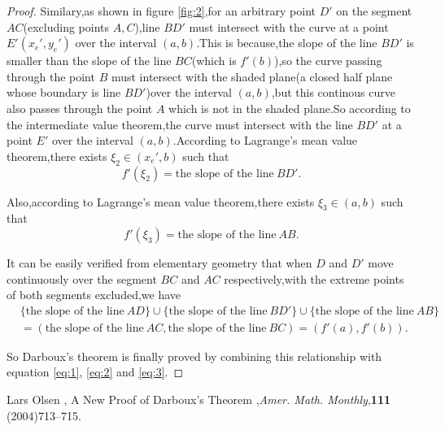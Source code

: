 \documentclass{amsart}
\theoremstyle{plain}
\theoremstyle{definition}
\begin{document}
\begin{proof}
Similary,as shown in figure \eqref{fig:2},for an arbitrary point $D'$
on the segment $AC$(excluding points $A,C$),line $BD'$ must intersect with the curve at a
point $E'(x_e',y_e')$ over the interval $(a,b)$.This is because,the
slope of the line $BD'$ is smaller than the slope of the line
$BC$(which is $f'(b)$),so the curve passing through the point $B$ must
intersect with the shaded plane(a closed half plane whose boundary is
line $BD'$)over the interval $(a,b)$,but this continous curve also passes through
the point $A$ which is not in the shaded plane.So according to the intermediate value theorem,the curve must
  intersect with the line $BD'$ at a point $E'$ over the interval
  $(a,b)$.According to Lagrange's mean value theorem,there exists
  $\xi_2\in (x_e',b)$ such that
\begin{equation}\label{eq:2}
f'(\xi_2)=\mbox{the slope of the line}~BD'.
\end{equation}

Also,according to Lagrange's mean value theorem,there exists $\xi_3\in
(a,b)$ such that
\begin{equation}
  \label{eq:3}
  f'(\xi_3)=\mbox{the slope of the line}~AB.
\end{equation}

It can be easily verified from elementary geometry that when $D$ and $D'$ move continuously over the segment $BC$ and $AC$
respectively,with the extreme points of both segments excluded,we have
\begin{align*}
&\{\mbox{the slope of the line}~AD\}\cup\{\mbox{the slope of the
  line}~BD'\}\cup\{\mbox{the slope of the line}~AB\}\\&=(\mbox{the slope of the line}~AC,\mbox{the slope of the line}~BC)=(f'(a),f'(b)).
\end{align*}

So Darboux's theorem is finally proved by combining this relationship with  equation \eqref{eq:1},
\eqref{eq:2} and \eqref{eq:3}.
\end{proof}
\begin{thebibliography}{1}
 Lars Olsen , A New Proof of Darboux's Theorem ,\textit{Amer. Math. Monthly},\textbf{111} (2004)713--715.
\end{thebibliography}
\end{document}
